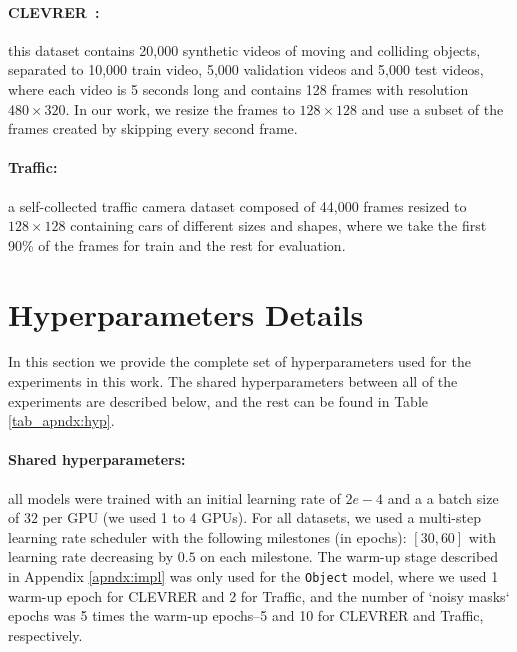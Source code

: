 \documentclass[nohyperref]{article}
\theoremstyle{plain}
\theoremstyle{definition}
\theoremstyle{remark}
\begin{document}
\paragraph{CLEVRER~\cite{yi2019clevrer}:} this dataset contains 20,000 synthetic videos of moving and colliding objects, separated to 10,000 train video, 5,000 validation videos and 5,000 test videos, where each video is 5 seconds long and contains 128 frames with resolution $480 \times 320$. In our work, we resize the frames to $128 \times 128$ and use a subset of the frames created by skipping every second frame.

\paragraph{Traffic:} a self-collected traffic camera dataset composed of 44,000 frames resized to $128\times128$ containing cars of different sizes and shapes, where we take the first 90\% of the frames for train and the rest for evaluation.

\section{Hyperparameters Details}
\label{apndx:hyp}
In this section we provide the complete set of hyperparameters used for the experiments in this work. The shared hyperparameters between all of the experiments are described below, and the rest can be found in Table \ref{tab_apndx:hyp}.

\paragraph{Shared hyperparameters:} all models were trained with an initial learning rate of $2e-4$ and a a batch size of $32$ per GPU (we used 1 to 4 GPUs). For all datasets, we used a multi-step learning rate scheduler with the following milestones (in epochs): $[30, 60]$ with learning rate decreasing by $0.5$ on each milestone. The warm-up stage described in Appendix \ref{apndx:impl} was only used for the \texttt{Object} model, where we used 1 warm-up epoch for CLEVRER and 2 for Traffic, and the number of `noisy masks` epochs was 5 times the warm-up epochs--5 and 10 for CLEVRER and Traffic, respectively.
\end{document}
